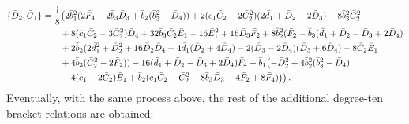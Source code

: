 \documentclass[10pt]{amsart}
\theoremstyle{definition}
\theoremstyle{corollary}
\theoremstyle{remark}
\theoremstyle{conclusion}
\begin{document}
\begin{align}
    \{\bar{D}_2, \bar{G}_1\}&=\frac{{\rm i}}{8}\bigl(2 \bar{b}_1^2(2 \bar{F}_4-2 \bar{b}_3 \bar{D}_3+\bar{b}_2(\bar{b}_3^2-\bar{D}_4))+2(\bar{c}_1 \bar{C}_2-2 \bar{C}_2^2)(2\bar{d}_1+\bar{D}_2-2 \bar{D}_3)-8 \bar{b}_3^2 \bar{C}_2^2 \nonumber\\ & \hskip 0.7cm +8(\bar{c}_1 \bar{C}_2-3 \bar{C}_2^2)\bar{D}_4+32 \bar{b}_3 \bar{C}_2 \bar{E}_1-16 \bar{E}_1^2+16 \bar{D}_3 \bar{F}_2+8 \bar{b}_2^2(\bar{F}_2-\bar{b}_3(\bar{d}_1+\bar{D}_2-\bar{D}_3+2 \bar{D}_4) \nonumber \\
& \hskip 0.7cm +2 \bar{b}_2(2\bar{d}_1^2+\bar{D}_2^2+16  \bar{D}_2 \bar{D}_4+4 \bar{d}_1(\bar{D}_2+4 \bar{D}_4)-2(\bar{D}_3-2\bar{D}_4)(\bar{D}_3+6 \bar{D}_4)-8 \bar{C}_2 \bar{E}_1 \nonumber \\
& \hskip 0.7cm +4 \bar{b}_3(\bar{C}_2^2-2\bar{F}_2)) -16 (\bar{d}_1+\bar{D}_2-\bar{D}_3+2\bar{D}_4)\bar{F}_4 +\bar{b}_1\bigl(-\bar{D}_2^2+4 \bar{b}_2^2(\bar{b}_3^2-\bar{D}_4)\nonumber\\
&\hskip 0.7cm -4 (\bar{c}_1-2\bar{C}_2)\bar{E}_1+\bar{b}_2(\bar{c}_1 \bar{C}_2-\bar{C}_2^2-8\bar{b}_3 \bar{D}_3-4 \bar{F}_2+8\bar{F}_4)\bigl) \bigl) \,  .
\end{align} 
Eventually, with the same process above, the rest of the additional degree-ten bracket relations are obtained: 
\end{document}
